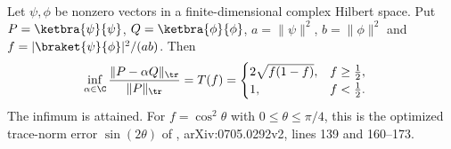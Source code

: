 \begin{theorem}
    \label{thm:optimized_pure_trace_minimum}
    \leanok
    Let $\psi,\phi$ be nonzero vectors in a finite-dimensional complex
    Hilbert space. Put $P=\ketbra{\psi}{\psi}$,
    $Q=\ketbra{\phi}{\phi}$,
    $a=\lVert\psi\rVert^2$, $b=\lVert\phi\rVert^2$ and
    $f=|\braket{\psi}{\phi}|^2/(ab)$.
    Then
    \begin{align}
        \inf_{\alpha\in\C}
        \frac{\lVert P-\alpha Q\rVert_{\tr}}{\lVert P\rVert_{\tr}}
        =T(f)
         & =\begin{cases}
                2\sqrt{f(1-f)}, & f\ge\tfrac12, \\
                1,              & f<\tfrac12.
            \end{cases}
        \label{eq:optimized_error_minimum}
    \end{align}
    The infimum is attained.
    For $f=\cos^2\theta$ with $0\le\theta\le\pi/4$, this is the
    optimized trace-norm error $\sin(2\theta)$ of
    \cite{Schuch2008Entropy}, arXiv:0705.0292v2, lines 139 and 160--173.
\end{theorem}
